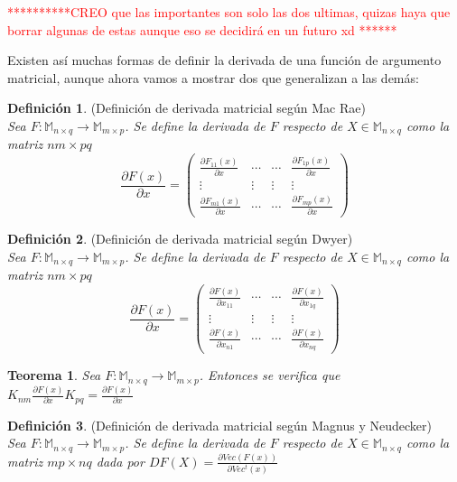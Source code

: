 \documentclass{article}
\theoremstyle{theorem-style}  %
\newtheorem{theorem}{Teorema}[section]  %
\theoremstyle{definition}
\newtheorem{definition}{Definición}[section]
\theoremstyle{example-style}
\begin{document}
\textcolor{red}{**********CREO que las importantes son solo las dos ultimas, quizas haya que borrar algunas de estas aunque eso se decidirá en un futuro xd ******}

Existen así muchas formas de definir la derivada de una función de argumento matricial, aunque ahora vamos a mostrar dos que generalizan a las demás:

\begin{definition}
	(Definición de derivada matricial según Mac Rae)\\
	\textit{Sea $F:\mathbb{M}_{n\times q}\rightarrow \mathbb{M}_{m\times p}$. Se define la derivada de $F$ respecto de $X\in \mathbb{M}_{n\times q}$ como la matriz $nm\times pq$}
	$$ \frac{\partial F(x)}{\partial x} = \left( \begin{array}{cccc}
	\frac{\partial F_{11}(x)}{\partial x} & \cdots & \cdots & \frac{\partial F_{1p}(x)}{\partial x}\\
	\vdots & \vdots & \vdots & \vdots \\
	\frac{\partial F_{m1}(x)}{\partial x} & \cdots & \cdots & \frac{\partial F_{mp}(x)}{\partial x}
	\end{array}\right)$$	
\end{definition}

\begin{definition}
	(Definición de derivada matricial según Dwyer)\\
\textit{	Sea $F:\mathbb{M}_{n\times q}\rightarrow \mathbb{M}_{m\times p}$. Se define la derivada de $F$ respecto de $X\in \mathbb{M}_{n\times q}$ como la matriz $nm\times pq$}
	$$ \frac{\partial F(x)}{\partial x} = \left( \begin{array}{cccc}
	\frac{\partial F(x)}{\partial x_{11}} & \cdots & \cdots & \frac{\partial F(x)}{\partial x_{1q}}\\
	\vdots & \vdots & \vdots & \vdots \\
	\frac{\partial F(x)}{\partial x_{n1}} & \cdots & \cdots & \frac{\partial F(x)}{\partial x_{nq}}
	\end{array}\right)$$	
\end{definition}

\begin{theorem}
		\textit{Sea $F:\mathbb{M}_{n\times q}\rightarrow \mathbb{M}_{m\times p}$. Entonces se verifica que $K_{nm}\frac{\partial F(x)}{\partial x}K_{pq}= \frac{\partial F(x)}{\partial x}$}
\end{theorem}

\begin{definition}
	(Definición de derivada matricial según Magnus y Neudecker)\\
\textit{	Sea $F:\mathbb{M}_{n\times q}\rightarrow \mathbb{M}_{m\times p}$. Se define la derivada de $F$ respecto de $X\in \mathbb{M}_{n\times q}$ como la matriz $mp\times nq$ dada por \textbf{$DF(X)=\frac{\partial Vec(F(x))}{\partial Vec^t(x)}$}}
\end{definition}
\end{document}
